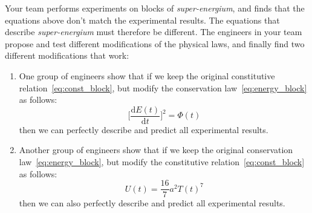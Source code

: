 \documentclass[a4paper,12pt,%
onecolumn,oneside,%
british%
]{memoir}
\newcommand*{\di}{\mathrm{d}}%
\renewcommand*{\|}[1][]{\nonscript\:#1\vert\nonscript\:\mathopen{}}
\newcommand*{\yE}{E}
\newcommand*{\yU}{U}
\newcommand*{\yH}{\varPhi}%
\newcommand*{\yT}{T}%
\begin{document}
Your team performs experiments on blocks of \emph{super-energium}, and finds that the equations above don't match the experimental results. The equations that describe \emph{super-energium} must therefore be different. The engineers in your team propose and test different modifications of the physical laws, and finally find two different modifications that work:
%
%
\begin{enumerate}[label=(\Alph*)]
\item\label{item:team_A} One group of engineers show that if we keep the original constitutive relation~\eqref{eq:const_block}, but modify the conservation law~\eqref{eq:energy_block} as follows:
  \begin{equation}
    \label{eq:energy_block_new}
    \biggl[\frac{\di\yE(t)}{\di t}\biggr]^{2} = \yH(t)
  \end{equation}
then we can perfectly describe and predict all experimental results.

\item\label{item:team_B} Another group of engineers show that if we keep the original conservation law~\eqref{eq:energy_block}, but modify the constitutive relation~\eqref{eq:const_block} as follows:
  \begin{equation}
    \label{eq:const_block_new}
    \yU(t) = \frac{16}{7} a^{2} \yT(t)^{7}
  \end{equation}
  then we can also perfectly describe and predict all experimental results.
\end{enumerate}
\end{document}
